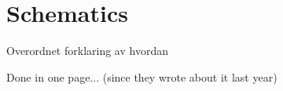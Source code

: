 \section {Schematics}

Overordnet forklaring av hvordan

Done in one page... (since they wrote about it last year)
